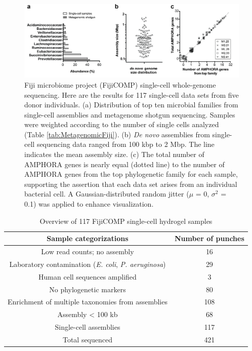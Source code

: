 \begin{figure}
\centering
\includegraphics[keepaspectratio,width=1\textwidth]{./figures/Thesis-23.png}
\caption[Fiji microbiome project single-cell whole-genome sequencing.]{Fiji microbiome project (FijiCOMP) single-cell whole-genome sequencing. Here are the results for 117 single-cell data sets from five donor individuals. (a) Distribution of top ten microbial families from single-cell assemblies and metagenome shotgun sequencing. Samples were weighted according to the number of single cells analyzed (Table \ref{tab:MetagenomicFiji}). (b) \textit{De novo} assemblies from single-cell sequencing data ranged from 100 kbp to 2 Mbp. The line indicates the mean assembly size. (c) The total number of AMPHORA genes is nearly equal (dotted line) to the number of AMPHORA genes from the top phylogenetic family for each sample, supporting the assertion that each data set arises from an individual bacterial cell. A Gaussian-distributed random jitter ($\mu$ = 0, $\sigma^{2}$ = 0.1) was applied to enhance visualization.}
\label{fig:Amphora}
\end{figure}

\begin{table}[h]
\centering 
\caption{Overview of 117 FijiCOMP single-cell hydrogel samples}
\label{tab:Fiji117cells}
\begin{adjustbox}{max width=\textwidth}
\begin{tabular}{c|c}
\hline 
Sample categorizations & Number of punches \\
\hline\hline
Low read counts; no assembly & 16 \\
Laboratory contamination (\textit{E. coli}, \textit{P. aeruginosa}) & 29 \\
Human cell sequences amplified & 3 \\
No phylogenetic markers & 80 \\
Enrichment of multiple taxonomies from assemblies & 108 \\
Assembly < 100 kb & 68 \\
\hline
\cellcolor{lightgray}Single-cell assemblies & \cellcolor{lightgray}117 \\
\hline
Total sequenced & 421 \\ \hline
\end{tabular}
\end{adjustbox}
\end{table}

